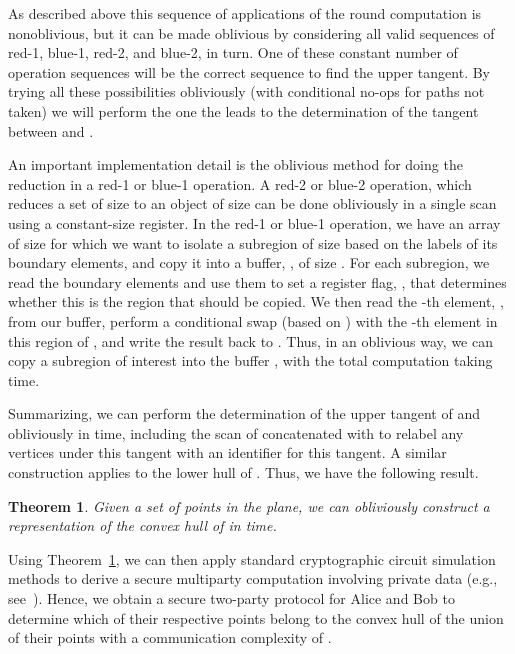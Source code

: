 \documentclass[11pt]{article}
\newtheorem{theorem}{Theorem}
\begin{document}
{As described above this sequence of applications of the round computation is
non\-ob\-liv\-i\-ous, but it can be made oblivious by 
considering all valid sequences of red-1, blue-1, red-2, and blue-2, in turn.
One of these constant number of operation sequences 
will be the correct sequence to find the upper tangent. By trying all
these possibilities obliviously (with conditional no-ops for
paths not taken)
we will perform the one 
the leads to the determination of the tangent between  and
.

An important implementation detail is the oblivious
method for doing the reduction in a red-1 or
blue-1 operation. A red-2 or blue-2 operation, which reduces a set of
size  to an object of size  can be done obliviously
in a single scan using a constant-size register.
In the red-1 or blue-1 operation, we have an array  of size  
for which we want to isolate a subregion of size  based on the labels of its boundary elements, and copy it into a
buffer, , of size .
For each subregion, we read the boundary elements and use them to set a register flag, ,
that determines whether this is the region that should be copied.
We then read the -th element, , from our buffer, 
perform a conditional swap (based on ) with the -th element 
in this region of , and write the result back to .
Thus, in an oblivious way, we can copy a subregion of interest into the buffer
, with the total computation taking  time.

Summarizing, we can perform the determination of the upper tangent of 
and  obliviously in  time, including the scan of 
concatenated with  to relabel any vertices under this tangent with
an identifier for this tangent.
A similar construction applies to the
lower hull of . Thus, we have the following result.

\begin{theorem} \label{thm:convex-hull}
Given a set  of  points in the plane, we can 
obliviously construct a representation of
the convex hull of  in  time.
\end{theorem}

Using Theorem~\ref{thm:convex-hull}, we can then apply standard cryptographic circuit simulation
methods to derive a secure multiparty computation involving private data 
(e.g., see~\cite{bnp-fssmp-08,clos-uctms-02,da-smpcp-01,dz-passm-02,m-smpcm-06,mnps-fstpc-04}).
Hence, we obtain a secure two-party protocol for Alice and Bob to
determine which of their respective points belong to the convex hull
of the union of their  points with a communication complexity of
.

}
\end{document}
